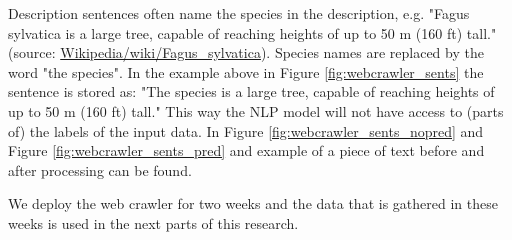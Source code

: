 \documentclass[a4paper, 12pt, oneside]{book} %
\begin{document}
Description sentences often name the species in the description, e.g. "Fagus sylvatica is a large tree, capable of reaching heights of up to 50 m (160 ft) tall." (source: \href{https://en.wikipedia.org/wiki/Fagus_sylvatica}{Wikipedia/wiki/Fagus\_sylvatica}).
Species names are replaced by the word "the species". 
In the example above in Figure \ref{fig:webcrawler_sents} the sentence is stored as: "The species is a large tree, capable of reaching heights of up to 50 m (160 ft) tall."
This way the NLP model will not have access to (parts of) the labels of the input data. In Figure \ref{fig:webcrawler_sents_nopred} and Figure \ref{fig:webcrawler_sents_pred} and example of a piece of text before and after processing can be found.

We deploy the web crawler for two weeks and the data that is gathered in these weeks is used in the next parts of this research. 
\end{document}
